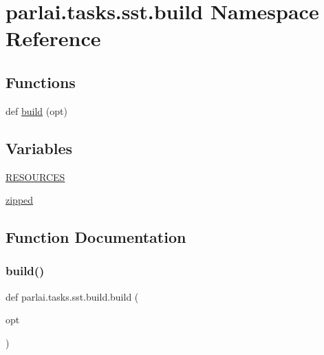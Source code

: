 \hypertarget{namespaceparlai_1_1tasks_1_1sst_1_1build}{}\section{parlai.\+tasks.\+sst.\+build Namespace Reference}
\label{namespaceparlai_1_1tasks_1_1sst_1_1build}
\subsection*{Functions}
\begin{DoxyCompactItemize}
\item 
def \hyperlink{namespaceparlai_1_1tasks_1_1sst_1_1build_af9e8461053fb439f9cf6e16c10bd6f63}{build} (opt)
\end{DoxyCompactItemize}
\subsection*{Variables}
\begin{DoxyCompactItemize}
\item 
\hyperlink{namespaceparlai_1_1tasks_1_1sst_1_1build_a2dd5a09775085687309bdec21b8cf7ad}{R\+E\+S\+O\+U\+R\+C\+ES}
\item 
\hyperlink{namespaceparlai_1_1tasks_1_1sst_1_1build_a2ef5f9953913e688ccfc417598b46892}{zipped}
\end{DoxyCompactItemize}


\subsection{Function Documentation}
\mbox{\label{namespaceparlai_1_1tasks_1_1sst_1_1build_af9e8461053fb439f9cf6e16c10bd6f63}} 
\subsubsection{\texorpdfstring{build()}{build()}}
{\footnotesize\ttfamily def parlai.\+tasks.\+sst.\+build.\+build (\begin{DoxyParamCaption}\item[{}]{opt }\end{DoxyParamCaption})}



